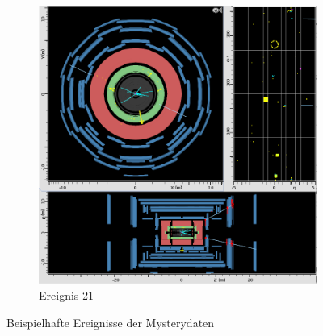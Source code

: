\begin{figure}[h]
\begin{subfigure}{.8\textwidth}
\centering
\includegraphics[width=.8\linewidth]{../Pictures/Auswertung/MysteryEvent21.png}
\caption{Ereignis 21}
\end{subfigure}%
\caption{Beispielhafte Ereignisse der Mysterydaten}
\label{mysterydata}
\end{figure}

\clearpage
